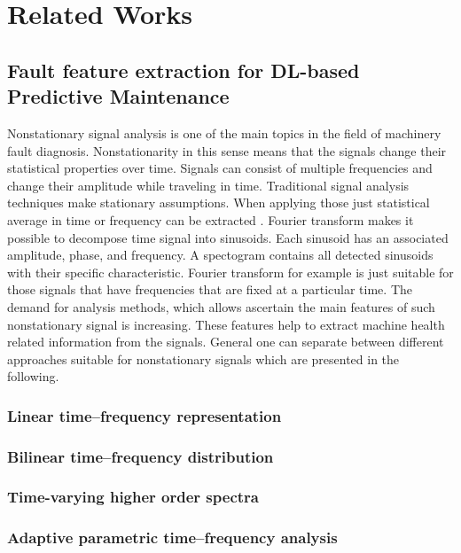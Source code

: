 
\chapter{Related Works}\label{chapter:related_works}


\section{Fault feature extraction for DL-based Predictive Maintenance}

Nonstationary signal analysis is one of the main topics in the field of machinery fault diagnosis. Nonstationarity in this sense means that the signals change their statistical properties over time. Signals can consist of multiple frequencies and change their amplitude while traveling in time. Traditional signal analysis techniques make stationary assumptions. When applying those just statistical average in time or frequency can be extracted \cite{FENG2013}. Fourier transform makes it possible to decompose time signal into sinusoids. Each sinusoid has an associated amplitude, phase, and frequency. A spectogram contains all detected sinusoids with their specific characteristic. Fourier transform for example is just suitable for those signals that have frequencies that are fixed at a particular time. The demand for analysis methods, which allows ascertain the main features of such nonstationary signal is increasing. These features help to extract machine health related information from the signals. General one can separate between different approaches suitable for nonstationary signals which are presented in the following. 

\subsection{Linear time–frequency representation}

\subsection{Bilinear time–frequency distribution}
\subsection{Time-varying higher order spectra}
\subsection{Adaptive parametric time–frequency analysis}
